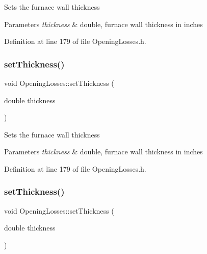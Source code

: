 Sets the furnace wall thickness 
\begin{DoxyParams}{Parameters}
{\em thickness} & double, furnace wall thickness in inches \\
\hline
\end{DoxyParams}


Definition at line 179 of file Opening\+Losses.\+h.

\mbox{\label{class_opening_losses_a221cc88072e4f0975f15c6cd96781dea}} 
\subsubsection{\texorpdfstring{set\+Thickness()}{setThickness()}\hspace{0.1cm}{\footnotesize\ttfamily [2/3]}}
{\footnotesize\ttfamily void Opening\+Losses\+::set\+Thickness (\begin{DoxyParamCaption}\item[{double}]{thickness }\end{DoxyParamCaption})\hspace{0.3cm}{\ttfamily [inline]}}

Sets the furnace wall thickness 
\begin{DoxyParams}{Parameters}
{\em thickness} & double, furnace wall thickness in inches \\
\hline
\end{DoxyParams}


Definition at line 179 of file Opening\+Losses.\+h.

\mbox{\label{class_opening_losses_a221cc88072e4f0975f15c6cd96781dea}} 
\subsubsection{\texorpdfstring{set\+Thickness()}{setThickness()}\hspace{0.1cm}{\footnotesize\ttfamily [3/3]}}
{\footnotesize\ttfamily void Opening\+Losses\+::set\+Thickness (\begin{DoxyParamCaption}\item[{double}]{thickness }\end{DoxyParamCaption})\hspace{0.3cm}{\ttfamily [inline]}}

